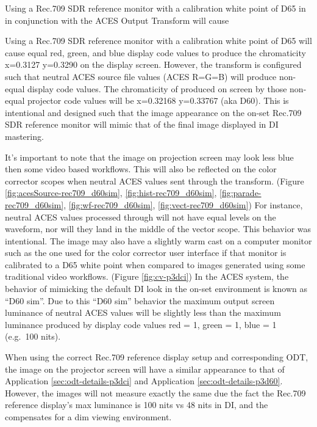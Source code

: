 Using a Rec.709 SDR reference monitor with a calibration white point of D65 in in conjunction with the ACES Output Transform \texttt{} will cause 

Using a Rec.709 SDR reference monitor with a calibration white point of D65 will cause
equal red, green, and blue display code values to produce the
chromaticity x=0.3127 y=0.3290 on the display screen. However, the
\texttt{} transform is configured such that neutral ACES source file values (ACES R=G=B) will produce non-equal
display code values. The chromaticity of produced on screen by those
non-equal projector code values will be x=0.32168 y=0.33767 (aka D60).  This is intentional and designed such that the image appearance on the on-set Rec.709 SDR reference monitor will mimic that of the final image displayed in DI mastering.

It's important to note that the image on projection screen may look less blue then some video based workflows. This will also be reflected on the color
corrector scopes when neutral ACES values sent through the
\texttt{} transform. (Figure \ref{fig:acesSource-rec709_d60sim}, \ref{fig:hist-rec709_d60sim}, \ref{fig:parade-rec709_d60sim}, \ref{fig:wf-rec709_d60sim}, \ref{fig:vect-rec709_d60sim}) For instance,
neutral ACES values processed through
\texttt{} will not have equal levels on
the waveform, nor will they land in the middle of the vector scope. This behavior was intentional. The image may also
have a slightly warm cast on a computer monitor such as the one
used for the color corrector user interface if that monitor is
calibrated to a D65 white point when compared to images generated using some traditional video workflows. (Figure \ref{fig:cv-p3dci}) In the ACES system, the behavior of mimicking the default DI look in the on-set environment is known as ``D60 sim''. Due to this ``D60 sim'' behavior the maximum output screen luminance of neutral ACES values will be
slightly less than the maximum luminance produced by display code
values red = 1, green = 1, blue = 1 (e.g.~100 nits).

When using the correct Rec.709 reference display setup and corresponding ODT, the image
on the projector screen will have a similar appearance to that of Application \ref{sec:odt-details-p3dci} and Application \ref{sec:odt-details-p3d60}.  However, the images will not measure exactly the same due the fact the Rec.709 reference display's max luminance is 100 nits vs 48 nits in DI, and the \texttt{} compensates for a dim viewing environment.

